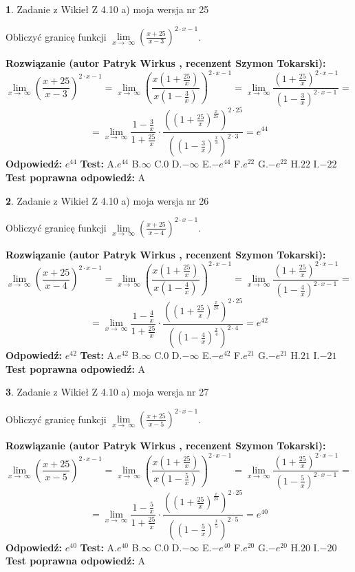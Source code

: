 \documentclass[12pt, a4paper]{article}
\theoremstyle{definition} %
\newtheorem{zad}{}
\newcommand{\zadStart}[1]{\begin{zad}#1\newline}
\newcommand{\zadStop}{\end{zad}}
\newcommand{\rozwStart}[2]{\noindent \textbf{Rozwiązanie (autor #1 , recenzent #2): }\newline}
\newcommand{\rozwStop}{\newline}
\newcommand{\odpStart}{\noindent \textbf{Odpowiedź:}\newline}
\newcommand{\odpStop}{\newline}
\newcommand{\testStart}{\noindent \textbf{Test:}\newline}
\newcommand{\testStop}{\newline}
\newcommand{\kluczStart}{\noindent \textbf{Test poprawna odpowiedź:}\newline}
\newcommand{\kluczStop}{\newline}
\begin{document}
\zadStart{Zadanie z Wikieł Z 4.10 a) moja wersja nr 25}

Obliczyć granicę funkcji  $\lim\limits_{x\to\ \infty}(\frac{x+25}{x-3})^{2\cdot x-1}$.
\zadStop
\rozwStart{Patryk Wirkus}{Szymon Tokarski}
$$\lim\limits_{x\to\ \infty}(\frac{x+25}{x-3})^{2\cdot x-1} = \lim\limits_{x\to\ \infty}(\frac{x(1+\frac{25}{x})}{x(1-\frac{3}{x})})^{2\cdot x-1}=\lim\limits_{x\to\ \infty}\frac{(1+\frac{25}{x})^{2\cdot x-1}}{(1-\frac{3}{x})^{2\cdot x-1}}=$$
$$=\lim\limits_{x\to\ \infty}\frac{1-\frac{3}{x}}{1+\frac{25}{x}}\cdot\frac{((1+\frac{25}{x})^{\frac{x}{25}})^{2\cdot25}}{((1-\frac{3}{x})^{\frac{x}{3}})^{2\cdot3}}=e^{44}$$
\rozwStop
\odpStart
$e^{44}$
\odpStop
\testStart
A.$e^{44}$ B.$\infty$ C.$0$ D.$-\infty$ E.$-e^{44}$
F.$e^{22}$ G.$-e^{22}$
H.$22$
I.$-22$
\testStop
\kluczStart
A
\kluczStop



\zadStart{Zadanie z Wikieł Z 4.10 a) moja wersja nr 26}

Obliczyć granicę funkcji  $\lim\limits_{x\to\ \infty}(\frac{x+25}{x-4})^{2\cdot x-1}$.
\zadStop
\rozwStart{Patryk Wirkus}{Szymon Tokarski}
$$\lim\limits_{x\to\ \infty}(\frac{x+25}{x-4})^{2\cdot x-1} = \lim\limits_{x\to\ \infty}(\frac{x(1+\frac{25}{x})}{x(1-\frac{4}{x})})^{2\cdot x-1}=\lim\limits_{x\to\ \infty}\frac{(1+\frac{25}{x})^{2\cdot x-1}}{(1-\frac{4}{x})^{2\cdot x-1}}=$$
$$=\lim\limits_{x\to\ \infty}\frac{1-\frac{4}{x}}{1+\frac{25}{x}}\cdot\frac{((1+\frac{25}{x})^{\frac{x}{25}})^{2\cdot25}}{((1-\frac{4}{x})^{\frac{x}{4}})^{2\cdot4}}=e^{42}$$
\rozwStop
\odpStart
$e^{42}$
\odpStop
\testStart
A.$e^{42}$ B.$\infty$ C.$0$ D.$-\infty$ E.$-e^{42}$
F.$e^{21}$ G.$-e^{21}$
H.$21$
I.$-21$
\testStop
\kluczStart
A
\kluczStop



\zadStart{Zadanie z Wikieł Z 4.10 a) moja wersja nr 27}

Obliczyć granicę funkcji  $\lim\limits_{x\to\ \infty}(\frac{x+25}{x-5})^{2\cdot x-1}$.
\zadStop
\rozwStart{Patryk Wirkus}{Szymon Tokarski}
$$\lim\limits_{x\to\ \infty}(\frac{x+25}{x-5})^{2\cdot x-1} = \lim\limits_{x\to\ \infty}(\frac{x(1+\frac{25}{x})}{x(1-\frac{5}{x})})^{2\cdot x-1}=\lim\limits_{x\to\ \infty}\frac{(1+\frac{25}{x})^{2\cdot x-1}}{(1-\frac{5}{x})^{2\cdot x-1}}=$$
$$=\lim\limits_{x\to\ \infty}\frac{1-\frac{5}{x}}{1+\frac{25}{x}}\cdot\frac{((1+\frac{25}{x})^{\frac{x}{25}})^{2\cdot25}}{((1-\frac{5}{x})^{\frac{x}{5}})^{2\cdot5}}=e^{40}$$
\rozwStop
\odpStart
$e^{40}$
\odpStop
\testStart
A.$e^{40}$ B.$\infty$ C.$0$ D.$-\infty$ E.$-e^{40}$
F.$e^{20}$ G.$-e^{20}$
H.$20$
I.$-20$
\testStop
\kluczStart
A
\kluczStop
\end{document}
